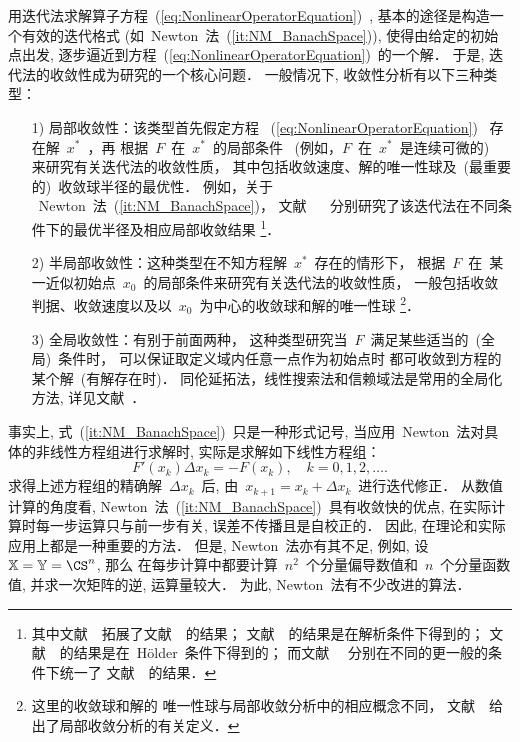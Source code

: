 用迭代法求解算子方程~(\ref{eq:NonlinearOperatorEquation})~,
基本的途径是构造一个有效的迭代格式
(如~Newton~法~(\ref{it:NM_BanachSpace})), 使得由给定的初始点出发,
逐步逼近到方程~(\ref{eq:NonlinearOperatorEquation})~的一个解． 于是,
迭代法的收敛性成为研究的一个核心问题． 一般情况下,
收敛性分析有以下三种类型：
\begin{itemize}
\item[1)]
局部收敛性：该类型首先假定方程
~(\ref{eq:NonlinearOperatorEquation})~ 存在解~$x^*$~，再
根据~$F$~在~$x^*$~的局部条件 ~(例如，$F$~在~$x^*$~是连续可微的)~
来研究有关迭代法的收敛性质，
其中包括收敛速度、解的唯一性球及~(最重要的)~收敛球半径的最优性．
例如，关于 ~Newton~法~(\ref{it:NM_BanachSpace})， 文献
~\cite{Traub1979,Ypma1982,Smale1986,Wang2000a,Huang2004,Proinov2009,Ferreira2009b}~
分别研究了该迭代法在不同条件下的最优半径及相应局部收敛结果
\footnote{其中文献~\cite{Ypma1982}~拓展了文献~\cite{Traub1979}~的结果；
文献~\cite{Smale1986}~的结果是在解析条件下得到的；
文献~\cite{Huang2004}~的结果是在~H\"{o}lder~条件下得到的；
而文献~\cite{Wang2000a,Proinov2009,Ferreira2009b}~
分别在不同的更一般的条件下统一了
文献~\cite{Traub1979,Ypma1982,Smale1986}~的结果．}．
\item[2)]
半局部收敛性：这种类型在不知方程解~$x^*$~存在的情形下，
根据~$F$~在~某一近似初始点~$x_0$~的局部条件来研究有关迭代法的收敛性质，
一般包括收敛判据、收敛速度以及以~$x_0$~为中心的收敛球和解的唯一性球
\footnote{这里的收敛球和解的
唯一性球与局部收敛分析中的相应概念不同，
文献~\cite{Huang2004}~给出了局部收敛分析的有关定义．}．
\item[3)]
全局收敛性：有别于前面两种，
这种类型研究当~$F$~满足某些适当的~(全局)~条件时，
可以保证取定义域内任意一点作为初始点时
都可收敛到方程的某个解~(有解存在时)．
同伦延拓法，线性搜索法和信赖域法是常用的全局化方法,
详见文献~\cite{Ortega1970,Dennis1996,Deuflhard2004}．
\end{itemize}

事实上, 式~(\ref{it:NM_BanachSpace})~只是一种形式记号,
当应用~Newton~法对具体的非线性方程组进行求解时,
实际是求解如下线性方程组：
\begin{equation}
\label{eq:NewtonEquation} F'(x_k)\Delta x_k = - F(x_k),\quad k =
0,1,2,\ldots.
\end{equation}
求得上述方程组的精确解~$\Delta x_k$~后, 由~$x_{k+1} = x_k + \Delta
x_k$~进行迭代修正． 从数值计算的角度看,
Newton~法~(\ref{it:NM_BanachSpace})~具有收敛快的优点,
在实际计算时每一步运算只与前一步有关, 误差不传播且是自校正的． 因此,
在理论和实际应用上都是一种重要的方法． 但是, Newton~法亦有其不足,
例如, 设~$\mathbb{X}=\mathbb{Y} = \CS^n$, 那么
在每步计算中都要计算~$n^2$~个分量偏导数值和~$n$~个分量函数值,
并求一次矩阵的逆, 运算量较大． 为此, Newton~法有不少改进的算法．

